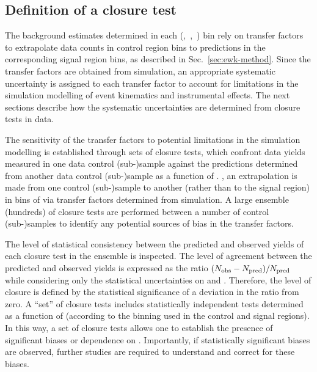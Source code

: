 
\subsection{Definition of a closure test}
\label{sec:closure-tests-desc}
\label{sec:bkgdnorm-syst}

The background estimates determined in each (\njet,~\nb,~\scalht) bin
rely on transfer factors to extrapolate data counts in control region
bins to predictions in the corresponding signal region bins, as
described in Sec.~\ref{sec:ewk-method}. Since the transfer factors are
obtained from simulation, an appropriate systematic uncertainty is
assigned to each transfer factor to account for limitations in the
simulation modelling of event kinematics and instrumental effects. The
next sections describe how the systematic uncertainties are determined
from closure tests in data.

The sensitivity of the transfer factors to potential limitations in
the simulation modelling is established through sets of closure tests,
which confront data yields measured in one data control (sub-)sample
against the predictions determined from another data control
(sub-)sample as a function of \scalht. \ie, an extrapolation is made
from one control (sub-)sample to another (rather than to the signal
region) in bins of \scalht via transfer factors determined from
simulation. A large ensemble (\ie hundreds) of closure tests are
performed between a number of control (sub-)samples to identify any
potential sources of bias in the transfer factors.

The level of statistical consistency between the predicted and
observed yields of each closure test in the ensemble is inspected. The
level of agreement between the predicted and observed yields is
expressed as the ratio $(N_{\textrm{obs}} - N_{\textrm{pred}})/N_{\textrm{pred}}$ while considering only
the statistical uncertainties on \npre and \nobs. Therefore, the level
of closure is defined by the statistical significance of a deviation
in the ratio from zero. A ``set'' of closure tests includes
statistically independent tests determined as a function of \scalht
(according to the \scalht binning used in the control and signal
regions). In this way, a set of closure tests allows one to establish
the presence of significant biases or dependence on
\scalht. Importantly, if statistically significant biases are
observed, further studies are required to understand and correct for
these biases. %

